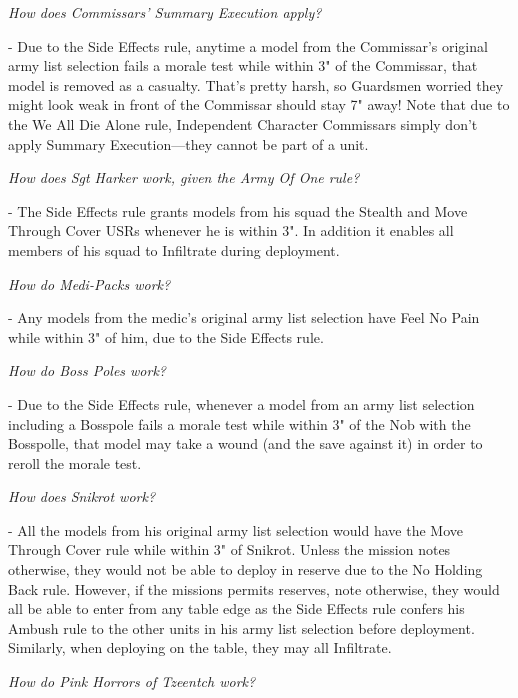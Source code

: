 \begin{multicols}{2}
\bigskip{}%

\smallskip\noindent\emph{How does Commissars' Summary Execution
  apply?}

- Due to the Side Effects rule, anytime a model from the Commissar's
  original army list selection fails a morale test while within 3" of
  the Commissar, that model is removed as a casualty.  That's pretty
  harsh, so Guardsmen worried they might look weak in front of the
  Commissar should stay 7" away!  Note that due to the We All Die
  Alone rule, Independent Character Commissars simply don't apply
  Summary Execution---they cannot be part of a unit.

\smallskip\noindent\emph{How does Sgt Harker work, given the Army Of One rule?}

- The Side Effects rule grants models from his squad the Stealth and
  Move Through Cover USRs whenever he is within 3".  In addition it
  enables all members of his squad to Infiltrate during deployment.

\smallskip\noindent\emph{How do Medi-Packs work?}

- Any models from the medic's original army list selection have Feel
  No Pain while within 3" of him, due to the Side Effects rule.

\bigskip{}%

\smallskip\noindent\emph{How do Boss Poles work?}

- Due to the Side Effects rule, whenever a model from an army list
  selection including a Bosspole fails a morale test while within 3"
  of the Nob with the Bosspolle, that model may take a wound (and the
  save against it) in order to reroll the morale test.

\smallskip\noindent\emph{How does Snikrot work?}

- All the models from his original army list selection would have the
  Move Through Cover rule while within 3" of Snikrot.  Unless the
  mission notes otherwise, they would not be able to deploy in reserve
  due to the No Holding Back rule.  However, if the missions permits
  reserves, note otherwise, they would all be able to enter from any
  table edge as the Side Effects rule confers his Ambush rule to the
  other units in his army list selection before deployment.
  Similarly, when deploying on the table, they may all Infiltrate.


\bigskip{}%

\smallskip\noindent\emph{How do Pink Horrors of Tzeentch work?}


\end{multicols}
